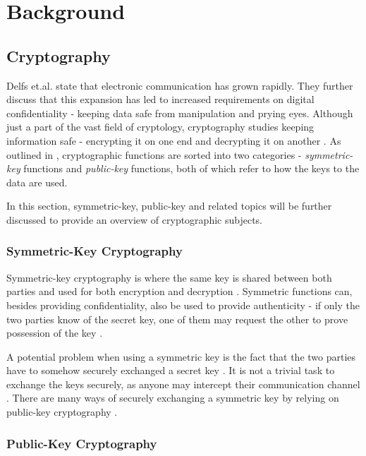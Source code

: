 \chapter{Background}
\label{chapter:background}

\section{Cryptography}

Delfs et.al. \cite{delfs2007} state that electronic communication has grown rapidly. They further discuss that this expansion has led to increased requirements on digital confidentiality - keeping data safe from manipulation and prying eyes. Although just a part of the vast field of cryptology, cryptography studies keeping information safe - encrypting it on one end and decrypting it on another \cite{delfs2007}. As outlined in \cite{bernstein2017}, cryptographic functions are sorted into two categories - \textit{symmetric-key} functions and \textit{public-key} functions, both of which refer to how the keys to the data are used.

In this section, symmetric-key, public-key and related topics will be further discussed to provide an overview of cryptographic subjects.

\subsection{Symmetric-Key Cryptography}

Symmetric-key cryptography is where the same key is shared between both parties and used for both encryption and decryption \cite{bernstein2017}. Symmetric functions can, besides providing confidentiality, also be used to provide authenticity - if only the two parties know of the secret key, one of them may request the other to prove possession of the key \cite{bernstein2017}.

A potential problem when using a symmetric key is the fact that the two parties have to somehow securely exchanged a secret key \cite{delfs2007}. It is not a trivial task to exchange the keys securely, as anyone may intercept their communication channel \cite{delfs2007}. There are many ways of securely exchanging a symmetric key by relying on public-key cryptography \cite{delfs2007}.

\subsection{Public-Key Cryptography}
\label{section:background:public-key-cryptography}

